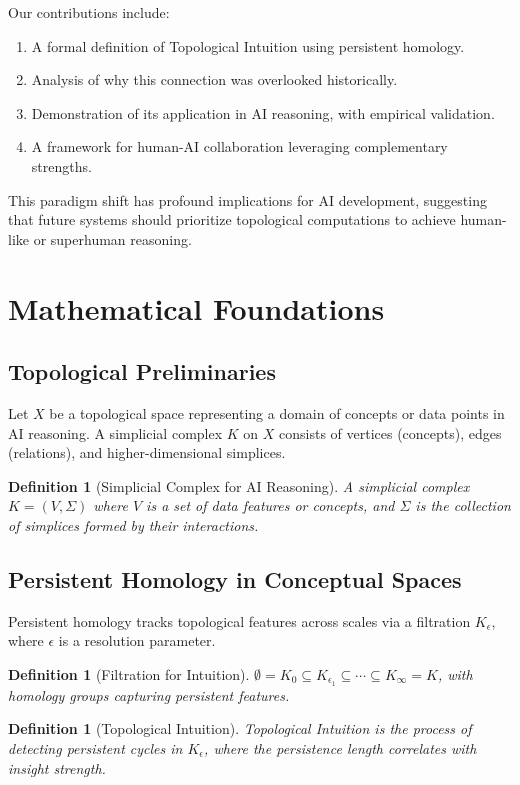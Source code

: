 \documentclass[11pt]{article}
\newtheorem{definition}[theorem]{Definition}
\begin{document}
Our contributions include:
\begin{enumerate}
\item A formal definition of Topological Intuition using persistent homology.
\item Analysis of why this connection was overlooked historically.
\item Demonstration of its application in AI reasoning, with empirical validation.
\item A framework for human-AI collaboration leveraging complementary strengths.
\end{enumerate}

This paradigm shift has profound implications for AI development, suggesting that future systems should prioritize topological computations to achieve human-like or superhuman reasoning.

\section{Mathematical Foundations}
\subsection{Topological Preliminaries}
Let $X$ be a topological space representing a domain of concepts or data points in AI reasoning. A simplicial complex $K$ on $X$ consists of vertices (concepts), edges (relations), and higher-dimensional simplices.

\begin{definition}[Simplicial Complex for AI Reasoning]
A simplicial complex $K = (V, \Sigma)$ where $V$ is a set of data features or concepts, and $\Sigma$ is the collection of simplices formed by their interactions.
\end{definition}

\subsection{Persistent Homology in Conceptual Spaces}
Persistent homology tracks topological features across scales via a filtration $K_\epsilon$, where $\epsilon$ is a resolution parameter.

\begin{definition}[Filtration for Intuition]
$\emptyset = K_0 \subseteq K_{\epsilon_1} \subseteq \cdots \subseteq K_\infty = K$, with homology groups capturing persistent features.
\end{definition}

\begin{definition}[Topological Intuition]
Topological Intuition is the process of detecting persistent cycles in $K_\epsilon$, where the persistence length correlates with insight strength.
\end{definition}
\end{document}
